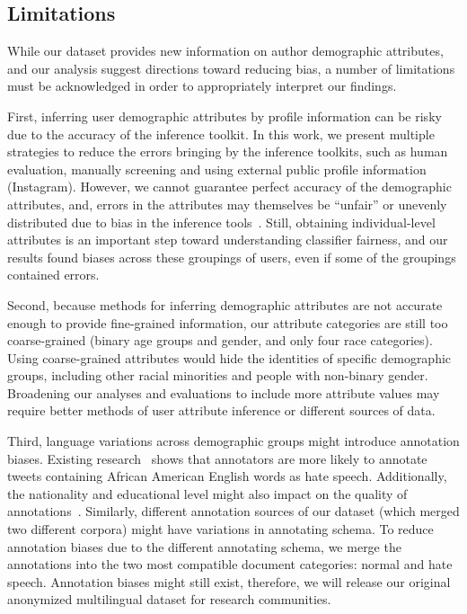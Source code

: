 \subsection{Limitations}
While our dataset provides new information on author demographic attributes, and our analysis suggest directions toward reducing bias, a number of limitations must be acknowledged in order to appropriately interpret our findings.


First, inferring user demographic attributes by profile information can be risky due to the accuracy of the inference toolkit.
In this work, we present multiple strategies to reduce the errors bringing by the inference toolkits, such as human evaluation, manually screening and using external public profile information (Instagram).
However, we cannot guarantee perfect accuracy of the demographic attributes,
and, errors in the attributes may themselves be ``unfair'' or unevenly distributed due to bias in the inference tools~\cite{buolamwini2018gender}.
Still, obtaining individual-level attributes is an important step toward understanding classifier fairness, and our results found biases across these groupings of users, even if some of the groupings contained errors.


Second, because methods for inferring demographic attributes are not accurate enough to provide fine-grained information, our attribute categories are still too coarse-grained (binary age groups and gender, and only four race categories).
Using coarse-grained attributes would hide the identities of specific demographic groups, including other racial minorities and people with non-binary gender.
Broadening our analyses and evaluations to include more attribute values may require better methods of user attribute inference or different sources of data.

Third, language variations across demographic groups might introduce annotation biases. Existing research~\cite{sap2019risk} shows that annotators are more likely to annotate tweets containing African American English words as hate speech.
Additionally, the nationality and educational level might also impact on the quality of annotations~\cite{founta2018large}.
Similarly, different annotation sources of our dataset (which merged two different corpora) might have variations in annotating schema.
To reduce annotation biases due to the different annotating schema,
we merge the annotations into the two most compatible document categories: normal and hate speech.
Annotation biases might still exist, therefore, 
we will release our original anonymized multilingual dataset for research communities.

